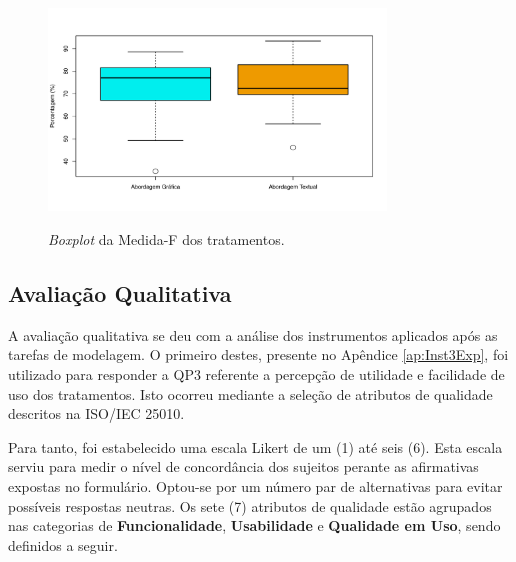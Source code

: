 \begin{figure}[!htb]
    \centering
    \caption{\textit{Boxplot} da Medida-F dos tratamentos.}
    \includegraphics[width=0.8\textwidth]{ResultsExp/BoxPlotAcertos}
    \label{fig:BoxPlotMedidaF}
\end{figure}


\subsection{Avaliação Qualitativa}


A avaliação qualitativa se deu com a análise dos instrumentos aplicados após as tarefas de modelagem.
O primeiro destes, presente no Apêndice \ref{ap:Inst3Exp}, foi utilizado para responder a \ac{QP}3 referente a percepção de utilidade e facilidade de uso dos tratamentos.
Isto ocorreu mediante a seleção de atributos de qualidade descritos na ISO/IEC 25010.

Para tanto, foi estabelecido uma escala Likert de um (1) até seis (6).
Esta escala serviu para medir o nível de concordância dos sujeitos perante as afirmativas expostas no formulário.
Optou-se por um número par de alternativas para evitar possíveis respostas neutras.
Os sete (7) atributos de qualidade estão agrupados nas categorias de \textbf{Funcionalidade}, \textbf{Usabilidade} e \textbf{Qualidade em Uso}, sendo definidos a seguir.

